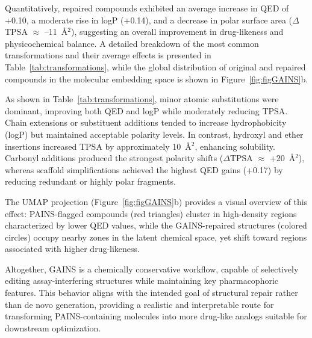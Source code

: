 Quantitatively, repaired compounds exhibited an average increase in QED of +0.10, a moderate rise in logP (+0.14), and a decrease in polar surface area ($\Delta$TPSA $\approx$ --11~\AA$^2$), suggesting an overall improvement in drug-likeness and physicochemical balance. A detailed breakdown of the most common transformations and their average effects is presented in Table~\ref{tab:transformations}, while the global distribution of original and repaired compounds in the molecular embedding space is shown in Figure~\ref{fig:figGAINS}b.

As shown in Table~\ref{tab:transformations}, minor atomic substitutions were dominant, improving both QED and logP while moderately reducing TPSA. Chain extensions or substituent additions tended to increase hydrophobicity (logP) but maintained acceptable polarity levels. In contrast, hydroxyl and ether insertions increased TPSA by approximately 10~\AA$^2$, enhancing solubility. Carbonyl additions produced the strongest polarity shifts ($\Delta$TPSA $\approx$ +20~\AA$^2$), whereas scaffold simplifications achieved the highest QED gains (+0.17) by reducing redundant or highly polar fragments.

The UMAP projection (Figure~\ref{fig:figGAINS}b) provides a visual overview of this effect: PAINS-flagged compounds (red triangles) cluster in high-density regions characterized by lower QED values, while the GAINS-repaired structures (colored circles) occupy nearby zones in the latent chemical space, yet shift toward regions associated with higher drug-likeness.

Altogether, GAINS is a chemically conservative workflow, capable of selectively editing assay-interfering structures while maintaining key pharmacophoric features. This behavior aligns with the intended goal of structural repair rather than de novo generation, providing a realistic and interpretable route for transforming PAINS-containing molecules into more drug-like analogs suitable for downstream optimization.

\vspace{0.5cm}

